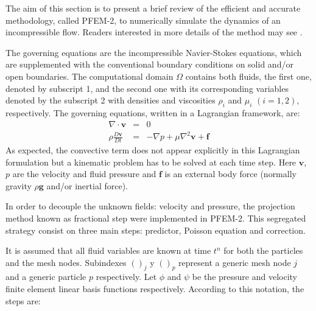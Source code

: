 The aim of this section is to present a brief review of the efficient and accurate methodology, called PFEM-2, to numerically simulate the dynamics of an incompressible flow. Readers interested in more details of the method may see \cite{Idelsohn12,Idelsohn12b,Gimenez14}.

The governing equations are the incompressible Navier-Stokes equations, which are supplemented with the conventional boundary conditions on solid and/or open boundaries. The computational domain $\Omega$ contains both fluids, the first one, denoted by subscript 1, and the second one with its corresponding variables denoted by the subscript 2 with densities and viscosities $\rho_i$ and $\mu_i$ $(i=1,2)$, respectively. 
The governing equations, written in a Lagrangian framework, are:
\begin{eqnarray}
  \nabla \cdot \mathbf{v} &=& 0 \label{eq:continuity} \\
  \rho\frac{D\mathbf{v}}{Dt} &=& -\nabla p + \mu \nabla^2 \mathbf{v} + \mathbf{f}\label{eq:momentum}
\end{eqnarray}
As expected, the convective term does not appear explicitly in this Lagrangian formulation but a kinematic problem has to be solved at each time step. Here $\mathbf{v}$, $p$ are the velocity and fluid pressure and $\mathbf{f}$ is an external body force (normally gravity $\rho \mathbf{g}$ and/or inertial force).

In order to decouple the unknown fields: velocity and pressure, the projection method known as fractional step were implemented in PFEM-2. This segregated strategy consist on three main steps: predictor, Poisson equation and correction.  

It is assumed that all fluid variables are known at time $t^n$ for both the particles and the mesh nodes. Subindexes $()_j$ y $()_p$ represent a generic mesh node $j$ and a generic particle $p$ respectively. Let $\phi$ and $\psi$ be the pressure and velocity finite element linear basis functions respectively. According to this notation, the steps are:

